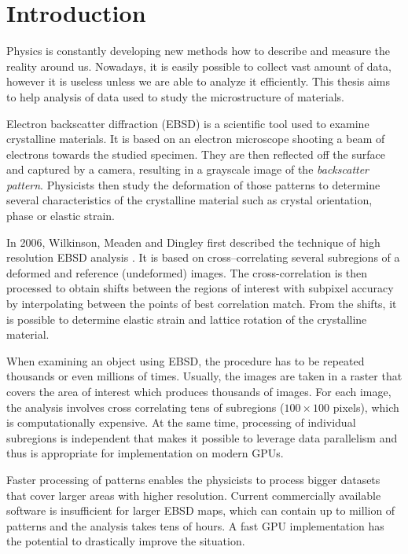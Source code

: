 \chapter*{Introduction}

Physics is constantly developing new methods how to describe and measure the reality around us. Nowadays, it is easily possible to collect vast amount of data, however it is useless unless we are able to analyze it efficiently. This thesis aims to help analysis of data used to study the microstructure of materials.

Electron backscatter diffraction (EBSD) is a scientific tool used to examine crystalline materials. It is based on an electron microscope shooting a beam of electrons towards the studied specimen. They are then reflected off the surface and captured by a camera, resulting in a grayscale image of the \emph{backscatter pattern}. Physicists then study the deformation of those patterns to determine several characteristics of the crystalline material such as crystal orientation, phase or elastic strain.

In 2006, Wilkinson, Meaden and Dingley first described the technique of high resolution EBSD analysis \cite{wilkinson2006high}. It is based on cross--correlating several subregions of a deformed and reference (undeformed) images. The cross-correlation is then processed to obtain shifts between the regions of interest with subpixel accuracy by interpolating between the points of best correlation match. From the shifts, it is possible to determine elastic strain and lattice rotation of the crystalline material.

When examining an object using EBSD, the procedure has to be repeated thousands or even millions of times. Usually, the images are taken in a raster that covers the area of interest which produces thousands of images. For each image, the analysis involves cross correlating tens of subregions ($100\times100$ pixels), which is computationally expensive. At the same time, processing of individual subregions is independent that makes it possible to leverage data parallelism and thus is appropriate for implementation on modern GPUs.

Faster processing of patterns enables the physicists to process bigger datasets that cover larger areas with higher resolution. Current commercially available software is insufficient for larger EBSD maps, which can contain up to million of patterns and the analysis takes tens of hours. A fast GPU implementation has the potential to drastically improve the situation.

